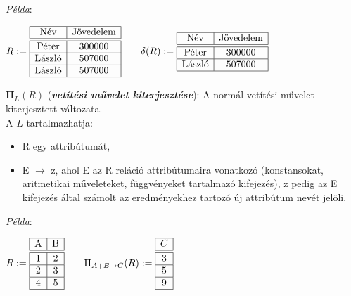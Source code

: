 \documentclass[tikz,12pt,margin=0px]{article}
\begin{document}
    \noindent \textit{Példa}:

        \begin{center}
            $R := \begin{array}{|c|c|}
                \hline
                \text{Név} & \text{Jövedelem} \\ \hline \hline
                \text{Péter} & 300000  \\ \hline
                \text{László} & 507000 \\ \hline
                \text{László} & 507000 \\ \hline
            \end{array} \qquad \delta(R) :=
            \begin{array}{|c|c|}
                \hline
                \text{Név} & \text{Jövedelem} \\ \hline \hline
                \text{Péter} & 300000  \\ \hline
                \text{László} & 507000 \\ \hline
            \end{array}$
    \end{center}

		\noindent $\boldsymbol{\Pi}_{L}(R)$ (\textbf{\emph{vetítési művelet kiterjesztése}}): A normál vetítési művelet kiterjesztett változata.\\

        \noindent A $L$ tartalmazhatja:
		\begin{itemize}
			\item R egy attribútumát,
			\item E $\to$ z, ahol E az R reláció attribútumaira vonatkozó (konstansokat, aritmetikai műveleteket, függvényeket tartalmazó kifejezés), z pedig az E kifejezés által számolt az eredményekhez tartozó új attribútum nevét jelöli. \\
		\end{itemize}

    \noindent \textit{Példa}:

        \begin{center}
            $R := \begin{array}{|c|c|}
                \hline
                \text{A} & \text{B} \\ \hline \hline
                1 & 2  \\ \hline
                2 & 3 \\ \hline
                4 & 5 \\ \hline
            \end{array} \qquad \Pi_{A+B \to C}(R) :=
            \begin{array}{|c|}
                \hline
                C \\ \hline \hline
                3  \\ \hline
                5 \\ \hline
                9 \\ \hline
            \end{array}$
        \end{center}
\end{document}
